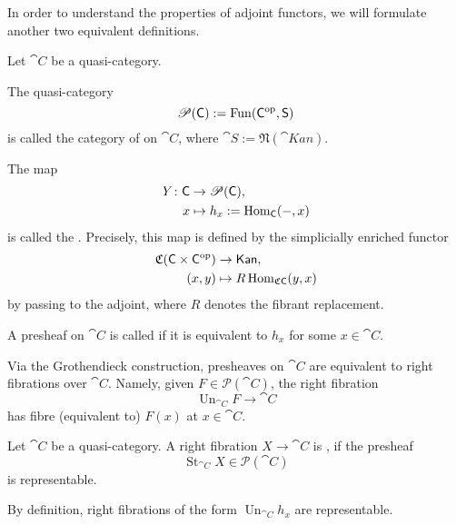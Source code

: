 In order to understand the properties of adjoint functors,
we will formulate another two equivalent definitions.

\begin{definition}
    Let $\cat C$ be a quasi-category.
    
    \begin{itms}
        \item The quasi-category 
        \[ \mathscr P(\mathsf{C}):=\operatorname{Fun}(\mathsf{C}^{\mathrm{op}},\mathsf{S}) \]
        is called the category of  on $\cat C$,
        where $\cat S:=\mathfrak N(\cat{Kan})$.
    
        \item The map
        \[\begin{aligned}
            Y\colon\mathsf{C}&\to\mathscr P(\mathsf{C}),\\
            x&\mapsto h_x:=\operatorname{Hom}_{\mathsf{C}}(-,x)
        \end{aligned}\]
        is called the .
        Precisely, this map is defined by the simplicially enriched functor 
        \[\begin{aligned}
            \mathfrak C(\mathsf{C}\times\mathsf{C}^{\mathrm{op}})&\to\mathsf{Kan},\\
            (x,y)&\mapsto R\operatorname{Hom}_{\mathfrak C\mathsf{C}}(y,x)
        \end{aligned}\]
        by passing to the adjoint,
        where $R$ denotes the fibrant replacement.
    
        \item A presheaf on $\cat C$ is called  if 
        it is equivalent to $h_x$ for some $x\in\cat C$.
    \end{itms}
\end{definition}

Via the Grothendieck construction,
presheaves on $\cat C$ are equivalent to right fibrations over $\cat C$.
Namely, given $F\in\mathscr P(\cat C)$, the right fibration 
\[ \operatorname{Un}_{\cat C}F\to\cat C \]
has fibre (equivalent to) $F(x)$ at $x\in\cat C$.

\begin{definition}
    Let $\cat C$ be a quasi-category.
    A right fibration $X\to\cat C$ is , 
    if the presheaf 
    \[ \operatorname{St}_{\cat C}X\in\mathscr P(\cat C) \]
    is representable.
\end{definition}

By definition, right fibrations of the form $\operatorname{Un}_{\cat C}h_x$
are representable.

